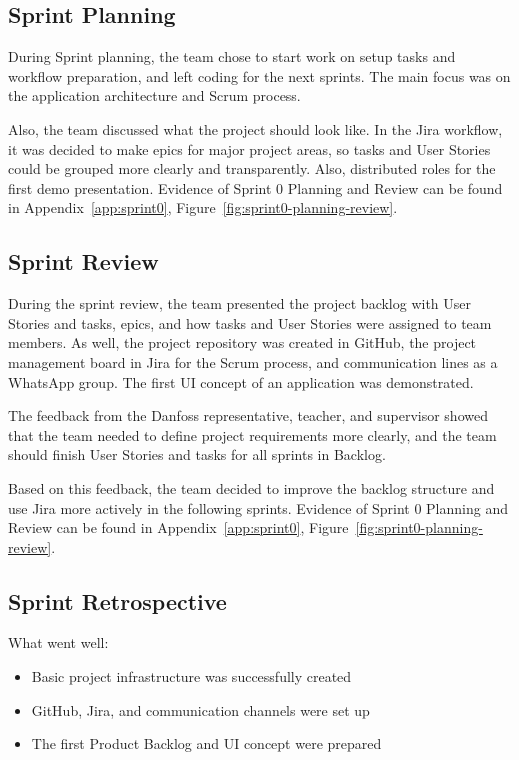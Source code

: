  

\subsection*{Sprint Planning}

During Sprint planning, the team chose to start work on setup tasks and workflow preparation, and left coding for the next sprints. The main focus was on the application architecture and Scrum process. 

Also, the team discussed what the project should look like. In the Jira workflow, it was decided to make epics for major project areas, so tasks and User Stories could be grouped more clearly and transparently. Also, distributed roles for the first demo presentation. Evidence of Sprint 0 Planning and Review can be found in Appendix~\ref{app:sprint0}, Figure~\ref{fig:sprint0-planning-review}.



 

\subsection*{Sprint Review}

During the sprint review, the team presented the project backlog with User Stories and tasks, epics, and how tasks and User Stories were assigned to team members. As well, the project repository was created in GitHub, the project management board in Jira for the Scrum process, and communication lines as a WhatsApp group. The first UI concept of an application was demonstrated. 

The feedback from the Danfoss representative, teacher, and supervisor showed that the team needed to define project requirements more clearly, and the team should finish User Stories and tasks for all sprints in Backlog.

Based on this feedback, the team decided to improve the backlog structure and use Jira more actively in the following sprints. Evidence of Sprint 0 Planning and Review can be found in Appendix~\ref{app:sprint0}, Figure~\ref{fig:sprint0-planning-review}.

 

\subsection*{Sprint Retrospective}

What went well:

\begin{itemize}

 \item Basic project infrastructure was successfully created

 \item GitHub, Jira, and communication channels were set up

 \item The first Product Backlog and UI concept were prepared

\end{itemize}



